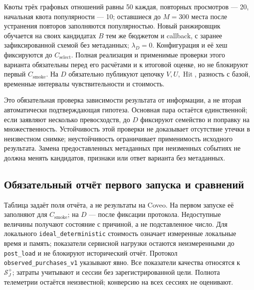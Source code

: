 \documentclass[12pt,a4paper]{article}
\newcommand{\code}[1]{{\ttfamily\small\nolinkurl{#1}}}
\theoremstyle{plainru}
\begin{document}
Квоты трёх графовых отношений равны 50 каждая, повторных просмотров ---
20, начальная квота популярности --- 10; оставшиеся до $M=300$ места
после устранения повторов заполняются популярностью. Новый ранжировщик
обучается на своих кандидатах $B$ тем же бюджетом и callback,
с заранее зафиксированной схемой без метаданных; $\lambda_D=0$.
Конфигурация и её хеш фиксируются до $C_{\mathrm{select}}$.
Полная реализация и применимые проверки этого варианта обязательны
перед его расчётами и к итоговой оценке, но не блокируют первый $C_{\mathrm{smoke}}$.
На $D$ обязательно публикуют цепочку $V,U,\operatorname{Hit}$,
разность с базой, временные интервалы чувствительности и стоимость.

Это обязательная проверка зависимости результата от информации,
а не вторая автоматически подтверждающая гипотеза. Основная пара
остаётся единственной; если заявляют несколько превосходств, до $D$
фиксируют семейство и поправку на множественность. Устойчивость этой
проверки не доказывает отсутствие утечки в неизвестном снимке;
неустойчивость ограничивает применимость исходного результата.
Замена предоставленных метаданных при неизменных событиях не должна
менять кандидатов, признаки или ответ варианта без метаданных.

\subsection{Обязательный отчёт первого запуска и сравнений}\label{app:diagnostic-output}

Таблица задаёт поля отчёта, а не результаты на Coveo. На первом запуске
её заполняют для $C_{\mathrm{smoke}}$; на $D$ --- после фиксации протокола. Недоступные
величины получают состояние с причиной, а не подставленное число.
Для локального \code{ideal_deterministic} стоимость означает измеренные
локальные время и память; показатели сервисной нагрузки остаются
неизмеренными до \code{post_load} и не блокируют исторический отчёт.
Протокол \code{observed_purchases_v1} указывают явно.
Все показатели качества относятся к $\mathcal S_J^+$; затраты
учитывают и сессии без зарегистрированной цели. Полнота телеметрии
остаётся неизвестной; конверсию на всех сессиях не оценивают.
\end{document}
